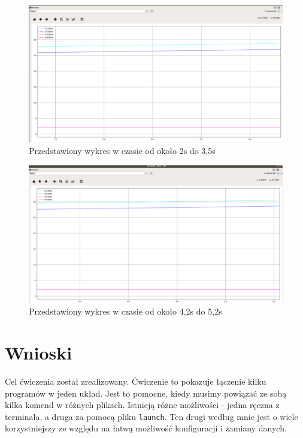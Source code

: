 \documentclass[10pt,a4paper,twoside,twocolumn]{article}%
\begin{document}
\begin{figure}[H]
    \centering
    \includegraphics[width=1\linewidth]{image15.png}
    \caption{Przedstawiony wykres w czasie od około 2s do 3,5s}
\end{figure}

\begin{figure}[H]
    \centering
    \includegraphics[width=1\linewidth]{image16.png}
    \caption{Przedstawiony wykres w czasie od około 4,2s do 5,2s}
\end{figure}

\section{Wnioski}
Cel ćwiczenia został zrealizowany. Ćwiczenie to pokazuje łączenie kilku programów w jeden układ. Jest to pomocne, kiedy musimy powiązać ze sobą kilka komend w różnych plikach. Istnieją różne możliwości - jedna ręczna z terminala, a druga za pomocą pliku \texttt{launch}. Ten drugi według mnie jest o wiele korzystniejszy ze względu na łatwą możliwość konfiguracji i zamiany danych.
\end{document}
